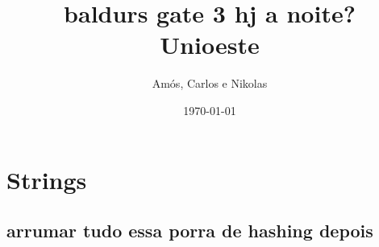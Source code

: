 \documentclass[11pt, a4paper, twoside]{article}
\title{baldurs gate 3 hj a noite? \\ Unioeste}
\author{Amós, Carlos e Nikolas}
\begin{document}
\twocolumn
\date{\today}
\maketitle


\renewcommand{\contentsname}{Índice} %
\tableofcontents


%
%

\section{Strings}

\subsection{arrumar tudo essa porra de hashing depois}
\end{document}
